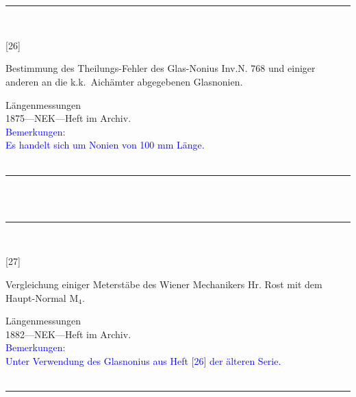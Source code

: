 \\
\vspace*{-2.5pt}\\
\parbox{\textwidth}{%
\rule{\textwidth}{1pt}\vspace*{-3mm}\\
\begin{minipage}[t]{0.15\textwidth}\vspace{0pt}
\Huge\rule[-4mm]{0cm}{1cm}[26]
\end{minipage}
\hfill
\begin{minipage}[t]{0.85\textwidth}\vspace{0pt}
\large Bestimmung des Theilungs-Fehler des Glas-Nonius Inv.N. 768 und einiger anderen an die k.k.\ Aichämter abgegebenen Glasnonien.\rule[-2mm]{0mm}{2mm}
\end{minipage}
{\footnotesize\flushright
Längenmessungen\\
}
1875\quad---\quad NEK\quad---\quad Heft im Archiv.\\
\textcolor{blue}{Bemerkungen:\\{}
Es handelt sich um Nonien von 100 mm Länge.\\{}
}
\\[-15pt]
\rule{\textwidth}{1pt}
}
\\
\vspace*{-2.5pt}\\
\parbox{\textwidth}{%
\rule{\textwidth}{1pt}\vspace*{-3mm}\\
\begin{minipage}[t]{0.15\textwidth}\vspace{0pt}
\Huge\rule[-4mm]{0cm}{1cm}[27]
\end{minipage}
\hfill
\begin{minipage}[t]{0.85\textwidth}\vspace{0pt}
\large Vergleichung einiger Meterstäbe des Wiener Mechanikers Hr. Rost mit dem Haupt-Normal {\glqq}M$_\mathrm{4}${\grqq}.\rule[-2mm]{0mm}{2mm}
\end{minipage}
{\footnotesize\flushright
Längenmessungen\\
}
1882\quad---\quad NEK\quad---\quad Heft im Archiv.\\
\textcolor{blue}{Bemerkungen:\\{}
Unter Verwendung des Glasnonius aus Heft [26] der älteren Serie.\\{}
}
\\[-15pt]
\rule{\textwidth}{1pt}
}
